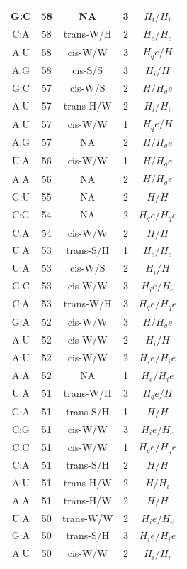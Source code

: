 \begin{center}
\begin{longtable}{c|c|c|c|c}
G:C & 58 & NA & 3 & $H_i/H_i$ \\  \hline
C:A & 58 & trans-W/H & 2 & $H_e/H_e$ \\  \hline
A:U & 58 & cis-W/W & 3 & $H_qe/H$ \\  \hline
A:G & 58 & cis-S/S & 3 & $H_i/H$ \\  \hline
G:C & 57 & cis-W/S & 2 & $H/H_qe$ \\  \hline
A:U & 57 & trans-H/W & 2 & $H_i/H_i$ \\  \hline
A:U & 57 & cis-W/W & 1 & $H_qe/H$ \\  \hline
A:G & 57 & NA & 2 & $H/H_qe$ \\  \hline
U:A & 56 & cis-W/W & 1 & $H/H_qe$ \\  \hline
A:A & 56 & NA & 2 & $H/H_qe$ \\  \hline
G:U & 55 & NA & 2 & $H/H$ \\  \hline
C:G & 54 & NA & 2 & $H_qe/H_qe$ \\  \hline
C:A & 54 & cis-W/W & 2 & $H/H$ \\  \hline
U:A & 53 & trans-S/H & 1 & $H_e/H_e$ \\  \hline
U:A & 53 & cis-W/S & 2 & $H_i/H$ \\  \hline
G:C & 53 & cis-W/W & 3 & $H_ie/H_e$ \\  \hline
C:A & 53 & trans-W/H & 3 & $H_qe/H_qe$ \\  \hline
G:A & 52 & cis-W/W & 3 & $H/H_qe$ \\  \hline
A:U & 52 & cis-W/W & 2 & $H_i/H$ \\  \hline
A:U & 52 & cis-W/W & 2 & $H_ie/H_ie$ \\  \hline
A:A & 52 & NA & 1 & $H_e/H_ie$ \\  \hline
U:A & 51 & trans-W/H & 3 & $H_qe/H$ \\  \hline
G:A & 51 & trans-S/H & 1 & $H/H$ \\  \hline
C:G & 51 & cis-W/W & 3 & $H_ie/H_e$ \\  \hline
C:C & 51 & cis-W/W & 1 & $H_qe/H_qe$ \\  \hline
C:A & 51 & trans-S/H & 2 & $H/H$ \\  \hline
A:U & 51 & trans-H/W & 2 & $H/H_i$ \\  \hline
A:A & 51 & trans-H/W & 2 & $H/H$ \\  \hline
U:A & 50 & trans-W/W & 2 & $H_ie/H_e$ \\  \hline
G:A & 50 & trans-S/H & 3 & $H_ie/H_ie$ \\  \hline
A:U & 50 & cis-W/W & 2 & $H_i/H_i$ \\  \hline

\end{longtable}
\end{center}
